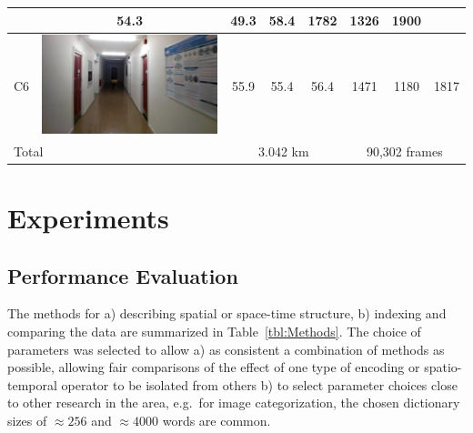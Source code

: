 \begin{table}[ht]
\begin{center}
\begin{tabular}{l c c c c c c c}
\begin{minipage}{.1\textwidth}
			   \end{minipage}
			        & 54.3  & 49.3 & 58.4 & 1782          & 1326 & 1900 \\ \hline
    C6       & \begin{minipage}{.1\textwidth}
      			\includegraphics[width=\linewidth]{./gfx/Chapter04/table/6.jpg}
			   \end{minipage}
			        & 55.9  & 55.4 & 56.4 & 1471          & 1180 & 1817 \\ \hline \hline
	\multicolumn{2}{l}{Total}      & \multicolumn{3}{c}{3.042 km} & \multicolumn{3}{c}{90,302 frames} \\ \hline
    \end{tabular}

\end{center}
\end{table}


\section{Experiments}
\label{sec:exp_methods}

\subsection{Performance Evaluation}

The methods for a) describing spatial or space-time structure, b) indexing and comparing the data are summarized in Table~\ref{tbl:Methods}. The choice of parameters was selected to allow a) as consistent a combination of methods as possible, allowing fair comparisons of the effect of one type of encoding or spatio-temporal operator to be isolated from others b) to select parameter choices close to other research in the area, e.g.\ for image categorization, the chosen dictionary sizes of $\approx 256$ and $\approx 4000$ words are common. 

